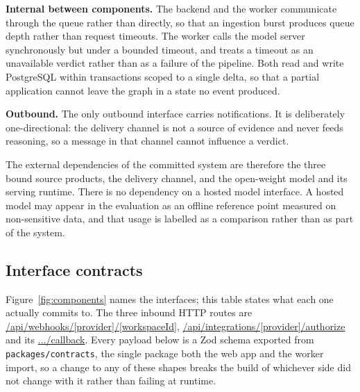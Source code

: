 \textbf{Internal between components.} The backend and the worker communicate
through the queue rather than directly, so that an ingestion burst produces
queue depth rather than request timeouts. The worker calls the model server
synchronously but under a bounded timeout, and treats a timeout as an
unavailable verdict rather than as a failure of the pipeline. Both read and
write PostgreSQL within transactions scoped to a single delta, so that a partial
application cannot leave the graph in a state no event produced.

\textbf{Outbound.} The only outbound interface carries notifications. It is
deliberately one-directional: the delivery channel is not a source of evidence
and never feeds reasoning, so a message in that channel cannot influence a
verdict.

The external dependencies of the committed system are therefore the three bound
source products, the delivery channel, and the open-weight model and its serving
runtime. There is no dependency on a hosted model interface. A hosted model may
appear in the evaluation as an offline reference point measured on
non-sensitive data, and that usage is labelled as a comparison rather than as
part of the system.

\subsection{Interface contracts}
\label{sec:ch5-contracts}

Figure~\ref{fig:components} names the interfaces; this table states what each
one actually commits to. The three inbound HTTP routes are
\url{/api/webhooks/[provider]/[workspaceId]},
\url{/api/integrations/[provider]/authorize} and its
\url{.../callback}. Every payload below is a Zod schema exported from
\texttt{packages/contracts}, the single package both the web app and the worker
import, so a change to any of these shapes breaks the build of whichever side
did not change with it rather than failing at runtime.

